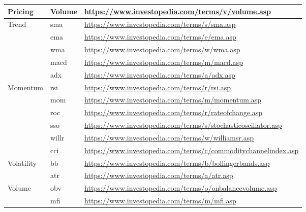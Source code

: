 \begin{landscape}
\begin{longtable}{lp{5cm}p{10cm}}
Pricing & Volume & \url{https://www.investopedia.com/terms/v/volume.asp} \\
\hline
Trend 
    & \acrfull{sma} & \url{https://www.investopedia.com/terms/s/sma.asp} \\
\cline{2-3}
    & \acrfull{ema} & \url{https://www.investopedia.com/terms/e/ema.asp} \\
\cline{2-3}
    & \acrfull{wma} & \url{https://www.investopedia.com/terms/w/wma.asp} \\
\cline{2-3}
    & \acrfull{macd} & \url{https://www.investopedia.com/terms/m/macd.asp} \\
\cline{2-3}
    & \acrfull{adx} & \url{https://www.investopedia.com/terms/a/adx.asp} \\
\hline
Momentum & \acrfull{rsi} & \url{https://www.investopedia.com/terms/r/rsi.asp} \\
\cline{2-3}
    & \acrfull{mom} & \url{https://www.investopedia.com/terms/m/momentum.asp} \\
\cline{2-3}
    & \acrfull{roc} & \url{https://www.investopedia.com/terms/r/rateofchange.asp} \\
\cline{2-3}
    & \acrfull{sso} & \url{https://www.investopedia.com/terms/s/stochasticoscillator.asp} \\
\cline{2-3}
    & \acrfull{willr} & \url{https://www.investopedia.com/terms/w/williamsr.asp} \\
\cline{2-3}
    & \acrfull{cci} & \url{https://www.investopedia.com/terms/c/commoditychannelindex.asp} \\
\hline
Volatility 
    & \acrfull{bb} & \url{https://www.investopedia.com/terms/b/bollingerbands.asp} \\
\cline{2-3}
    & \acrfull{atr} & \url{https://www.investopedia.com/terms/a/atr.asp} \\
\hline
Volume 
    & \acrfull{obv} & \url{https://www.investopedia.com/terms/o/onbalancevolume.asp} \\
\cline{2-3}
    & \acrfull{mfi} & \url{https://www.investopedia.com/terms/m/mfi.asp} \\
\end{longtable}

\end{landscape}